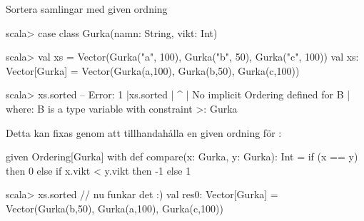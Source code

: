 


\begin{Slide}{Sortera samlingar med given ordning}\SlideFontSmall
\begin{REPLsmall}
scala> case class Gurka(namn: String, vikt: Int)

scala> val xs = Vector(Gurka("a", 100), Gurka("b", 50), Gurka("c", 100))
val xs: Vector[Gurka] = Vector(Gurka(a,100), Gurka(b,50), Gurka(c,100))

scala> xs.sorted
-- Error:
1 |xs.sorted
  | ^
  | No implicit Ordering defined for B
  | where: B is a type variable with constraint >: Gurka

\end{REPLsmall}
\pause
Detta kan fixas genom att tillhandahålla en given ordning för :
\begin{Code}
given Ordering[Gurka] with
  def compare(x: Gurka, y: Gurka): Int =
    if (x == y) then 0 
    else if x.vikt < y.vikt then -1 
    else 1
\end{Code}
\begin{REPL}
scala> xs.sorted   // nu funkar det :)
val res0: Vector[Gurka] = Vector(Gurka(b,50), Gurka(a,100), Gurka(c,100))
\end{REPL}
\end{Slide}

